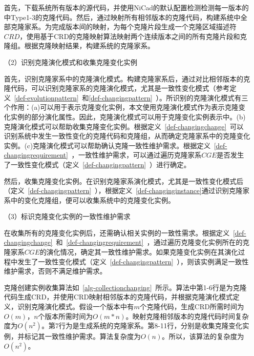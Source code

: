 首先，下载系统所有版本的源代码，并使用NiCad的默认配置检测检测每一版本的中Type1-3的克隆代码。然后，通过映射所有相邻版本的克隆代码，构建系统中全部克隆家系。为完成版本间的映射，为每个克隆片段生成一个克隆区域描述符 $CRD$\cite{duala2010clone}，使用基于CRD的克隆映射算法映射两个连续版本之间的所有克隆片段和克隆组\cite{ci2013new}\cite{ci2013newD}。根据克隆映射结果，构建系统的克隆家系。

（2）识别克隆演化模式和收集克隆变化实例

首先，识别克隆家系中的克隆演化模式。构建克隆家系后，通过对比相邻版本的克隆代码，可以识别克隆家系的克隆演化模式，尤其是一致性变化模式（参考定义~\ref{def-evolutionpattern}~和\ref{def-changingpattern}~）。所识别的克隆演化模式有三个作用：(a)可以用于表示克隆变化实例，本文使用克隆演化模式作为表示克隆变化实例的部分演化属性。因此，克隆演化模式可以用于克隆变化实例表示中。(b)克隆演化模式可以帮助收集克隆变化实例。根据定义~\ref{def-changingchange}~可以识别系统中发生一致性变化的克隆代码和克隆组，从而确定克隆家系中的克隆变化实例。(c)克隆演化模式可以帮助确认克隆一致性维护需求。根据定义~\ref{def-changingrequirement}~，一致性维护需求，可以通过遍历克隆家系$CGE$是否发生了一致性变化模式（定义~\ref{def-changingpattern}~）进行确定。

然后，收集克隆变化实例。在识别克隆家系演化模式，尤其是一致性变化模式后（定义~\ref{def-changingpattern}~），根据定义~\ref{def-changinginstance}通过识别克隆家系中的变化克隆组，便可以收集系统中的克隆变化实例。

（3）标识克隆变化实例的一致性维护需求

在收集所有的克隆变化实例后，还需确认相关实例的一致性需求。根据定义~\ref{def-changingchange}~和~\ref{def-changingrequirement}~，通过遍历克隆变化实例所在的克隆家系$CGE$的演化情况，确定其一致性维护需求。如果克隆变化实例在其演化过程中发生了一致性变化模式（定义~\ref{def-changingpattern}~），则该实例满足一致性维护需求，否则不满足维护需求。

克隆创建实例收集算法如~\ref{alg-collectionchanging}~所示。算法中第1-6行是为克隆代码生成CRD，并使用CRD映射相邻版本的克隆代码，并根据克隆演化模式定义，识别克隆演化模式。假设一个版本中有$m$个克隆代码，生成CRD所需时间为$O(m)$，$n$个版本所需时间为$O(m*n)$。映射克隆相邻版本的克隆代码时间复杂度为$O(n^2)$。第7行为是生成系统的克隆家系。第8-11行，分别是收集克隆变化实例，并标记其一致性维护需求。算法复杂度为$O(n)$。所以，该算法的复杂度为$O(n^2)$。

